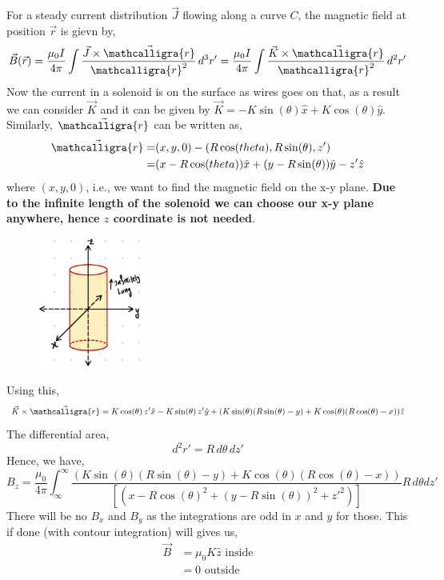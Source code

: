 \documentclass{article}
\newcommand{\scriptr}{\mathord{\mathcalligra{r}}}
\begin{document}
For a steady current distribution $\vec{J}$ flowing along a curve \(C\), the magnetic field at position $\vec{r}$ is gievn by,
\begin{equation}
\vec{B}(\vec{r})=\frac{\mu_0 I}{4\pi}\int \frac{\vec{J}\times \vec{\scriptr}}{\scriptr^2} \, d^3 r' = \frac{\mu_0 I}{4\pi}\int \frac{\vec{K}\times \vec{\scriptr}}{\scriptr^2}\, d^2 r'
\end{equation}
Now the current in a solenoid is on the surface as wires goes on that, as a result we can consider $\vec{K}$ and it can be given by $\vec{K}= -K \sin(\theta)\hat{x} + K \cos(\theta)\hat{y}$. Similarly, $\vec{\scriptr}$ can be written as,
\begin{equation*}
\begin{split}
    \vec{\scriptr} =& (x,y,0) - (R\cos(theta), R\sin(\theta), z')\\
                    =& (x-R\cos(theta))\hat{x}+(y-R\sin(\theta))\hat{y}-z' \hat{z}
\end{split}
\end{equation*}
where $(x,y,0)$, i.e., we want to find the magnetic field on the x-y plane. \textbf{Due to the infinite length of the solenoid we can choose our x-y plane anywhere, hence $z$ coordinate is not needed}.
\begin{figure}[H]
\centering
\includegraphics[width=0.3\textwidth]{Images/infinite_sol1.jpeg}
\caption{}
\label{sol_pb1}
\end{figure}
Using this, 
\begin{equation*}
    \vec{K}\times \vec{\scriptr} = K \cos(\theta)\, z' \hat{x} - K \sin(\theta)\, z' \hat{y} + (K\sin(\theta)(R\sin(\theta)-y)+K\cos(\theta)(R\cos(\theta)-x))\hat{z}
\end{equation*}
The differential area,
\begin{equation*}
    d^2r' = R\, d\theta \, dz'
\end{equation*}
Hence, we have,
\begin{equation}
    B_z = \frac{\mu_0}{4\pi}\int_{\infty}^{\infty}\frac{(K\sin(\theta)(R\sin(\theta)-y)+K\cos(\theta)(R\cos(\theta)-x))}{[(x-R\cos(\theta)^2+(y-R\sin(\theta))^2+ z'^2)]}R\, d\theta dz'
\end{equation}
There will be no $B_x$ and $B_y$ as the integrations are odd in $x$ and $y$ for those.
This if done (with contour integration) will gives us,
\begin{equation}
\begin{split}
    \vec{B} &= \mu_0 K \hat{z}\, \,  \text{inside}\\
    &= 0 \, \, \text{outside}
\end{split}
\end{equation}
\end{document}

